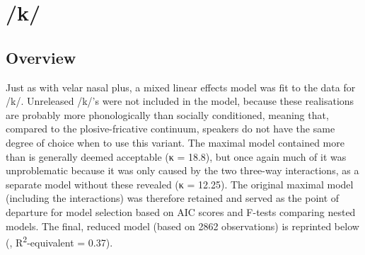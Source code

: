 \section{/k/}
\label{prod.res.con.k}

\subsection{Overview}
\label{sec.prod.res.con.k.overview}

Just as with velar nasal plus, a mixed linear effects model was fit to the data for /k/.
Unreleased /k/'s were not included in the model, because these realisations are probably more phonologically than socially conditioned, meaning that, compared to the plosive-fricative continuum, speakers do not have the same degree of choice when to use this variant.
The maximal model contained more  than is generally deemed acceptable (κ = 18.8), but once again much of it was unproblematic because it was only caused by the two three-way interactions, as a separate model without these revealed (κ = 12.25).
The original maximal model (including the interactions) was therefore retained and served as the point of departure for model selection based on AIC scores and F-tests comparing nested models.
The final, reduced model (based on 2862 observations) is reprinted below (, R\textsuperscript{2}-equivalent = 0.37).

